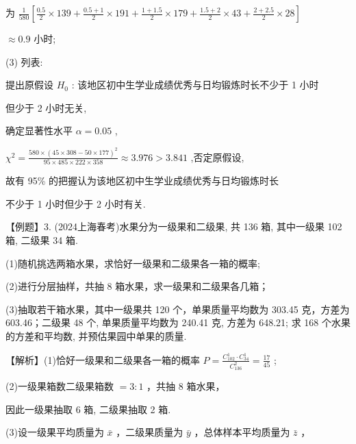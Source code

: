 \documentclass[10pt]{article}
\begin{document}
为 \(\frac{1}{580}\left\lbrack  {\frac{0.5}{2} \times  {139} + \frac{{0.5} + 1}{2} \times  {191} + \frac{1 + {1.5}}{2} \times  {179} + \frac{{1.5} + 2}{2} \times  {43} + \frac{2 + {2.5}}{2} \times  {28}}\right\rbrack\)

\(\approx  {0.9}\) 小时;

(3) 列表:

\begin{center}
\end{center}

提出原假设 \({H}_{0}\) : 该地区初中生学业成绩优秀与日均锻炼时长不少于 1 小时

但少于 2 小时无关,

确定显著性水平 \(\alpha  = {0.05}\) ,

\({\chi }^{2} = \frac{{580} \times  {\left( {45} \times  {308} - {50} \times  {177}\right) }^{2}}{{95} \times  {485} \times  {222} \times  {358}} \approx  {3.976} > {3.841}\) ,否定原假设,

故有 95\% 的把握认为该地区初中生学业成绩优秀与日均锻炼时长

不少于 1 小时但少于 2 小时有关.

【例题】3. (2024上海春考)水果分为一级果和二级果, 共 136 箱, 其中一级果 102 箱, 二级果 34 箱.

(1)随机挑选两箱水果，求恰好一级果和二级果各一箱的概率;

(2)进行分层抽样，共抽 8 箱水果，求一级果和二级果各几箱；

(3)抽取若干箱水果，其中一级果共 120 个，单果质量平均数为 303.45 克，方差为 603.46；二级果 48 个, 单果质量平均数为 240.41 克, 方差为 648.21; 求 168 个水果的方差和平均数, 并预估果园中单果的质量.

【解析】(1)恰好一级果和二级果各一箱的概率 \(P = \frac{{C}_{102}^{1} \cdot  {C}_{34}^{1}}{{C}_{136}^{2}} = \frac{17}{45}\) ;

(2)一级果箱数二级果箱数 \(= 3 : 1\) ，共抽 8 箱水果，

因此一级果抽取 6 箱, 二级果抽取 2 箱.

(3)设一级果平均质量为 \(\bar{x}\) ，二级果质量为 \(\bar{y}\) ，总体样本平均质量为 \(\bar{z}\) ，
\end{document}
